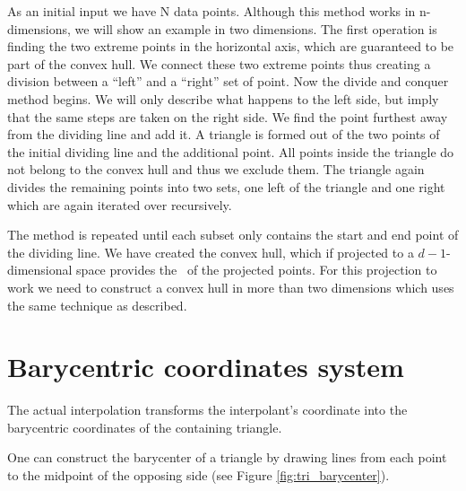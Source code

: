 As an initial input we have N data points. Although this method works in n-dimensions, we will show an example in two dimensions.
The first operation is finding the two extreme points in the horizontal axis, which are guaranteed to be part of the convex hull. 
We connect these two extreme points thus creating a division between a ``left'' and a ``right'' set of point. Now the divide and conquer method begins. We will only describe what happens to the left side, but imply that the same steps are taken on the right side. 
We find the point furthest away from the dividing line and add it. A triangle is formed out of the two points of the initial dividing line and the additional point. All points inside the triangle do not belong to the convex hull and thus we exclude them. The triangle again divides the remaining points into two sets, one left of the triangle and one right which are again iterated over recursively. 

The method is repeated until each subset only contains the start and end point of the dividing line. 
We have created the convex hull, which if projected to a $d - 1$-dimensional space provides the \deltri\ of the projected points. For this projection to work we need to construct a convex hull in more than two dimensions which uses the same technique as described.


\section{Barycentric coordinates system}

The actual interpolation transforms the interpolant's coordinate into the barycentric coordinates of the containing triangle.

One can construct the barycenter of a triangle by drawing lines from each point to the midpoint of the opposing side (see Figure \ref{fig:tri_barycenter}). 


